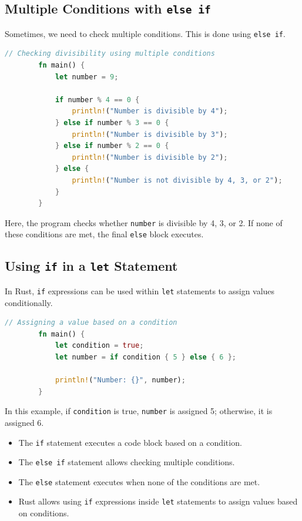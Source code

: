 \documentclass[a4paper,12pt]{report}
\begin{document}
	\subsection*{Multiple Conditions with \texttt{else if}}
	
	Sometimes, we need to check multiple conditions. This is done using \texttt{else if}.
	
	\begin{lstlisting}[language=Rust]
		// Checking divisibility using multiple conditions
		fn main() {
			let number = 9;
			
			if number % 4 == 0 {
				println!("Number is divisible by 4");
			} else if number % 3 == 0 {
				println!("Number is divisible by 3");
			} else if number % 2 == 0 {
				println!("Number is divisible by 2");
			} else {
				println!("Number is not divisible by 4, 3, or 2");
			}
		}
	\end{lstlisting}
	
		\noindent Here, the program checks whether \texttt{number} is divisible by 4, 3, or 2. If none of these conditions are met, the final \texttt{else} block executes.
	
	\subsection*{Using \texttt{if} in a \texttt{let} Statement}
	
	In Rust, \texttt{if} expressions can be used within \texttt{let} statements to assign values conditionally.
	
	\begin{lstlisting}[language=Rust]
		// Assigning a value based on a condition
		fn main() {
			let condition = true;
			let number = if condition { 5 } else { 6 };
			
			println!("Number: {}", number);
		}
	\end{lstlisting}
	
		\noindent In this example, if \texttt{condition} is true, \texttt{number} is assigned 5; otherwise, it is assigned 6.
	
	\begin{takeawaybox}
		\begin{itemize}
			\item The \texttt{if} statement executes a code block based on a condition.
			\item The \texttt{else if} statement allows checking multiple conditions.
			\item The \texttt{else} statement executes when none of the conditions are met.
			\item Rust allows using \texttt{if} expressions inside \texttt{let} statements to assign values based on conditions.
		\end{itemize}
	\end{takeawaybox}
	
\end{document}

